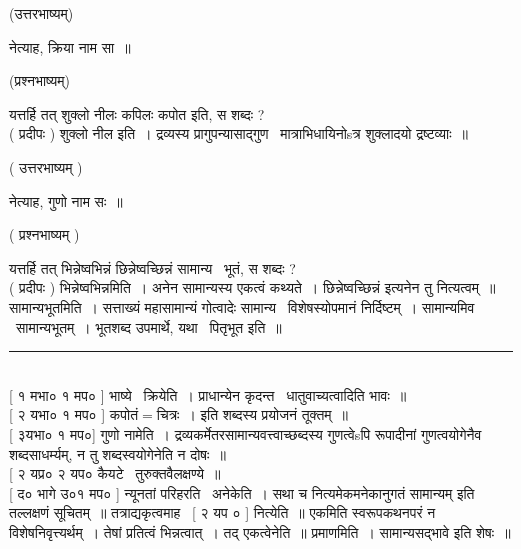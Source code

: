 \documentclass[11pt, openany]{book}
\begin{document}
\begin{multicols}{2}
\begin{center}
(उत्तरभाष्यम्)
\end{center}

{\qt नेत्याह, क्रिया नाम सा~॥}

\begin{center}
(प्रश्नभाष्यम्)
\end{center}

{\qt यत्तर्हि तत् शुक्लो नीलः कपिलः कपोत इति, स शब्दः ?}\\

( प्रदीपः ) शुक्लो नील इति~। द्रव्यस्य प्रागुपन्यासाद्गुण \textendash\ मात्राभिधायिनोsत्र शुक्लादयो द्रष्टव्याः~॥ 

\begin{center}
( उत्तरभाष्यम् )
\end{center}

{\qt नेत्याह, गुणो नाम सः~॥}

\begin{center}
( प्रश्नभाष्यम् )
\end{center}

{\qt यत्तर्हि तत् भिन्नेष्वभिन्नं छिन्नेष्वच्छिन्नं सामान्य \textendash\ भूतं, स शब्दः ? }\\

( प्रदीपः ) भिन्नेष्वभिन्नमिति~। अनेन सामान्यस्य {\qt एकत्वं} कथ्यते~। {\qt छिन्नेष्वच्छिन्नं} इत्यनेन तु {\qt नित्यत्वम्}~॥ सामान्यभूतमिति~।  सत्ताख्यं महासामान्यं गोत्वादेः सामान्य \textendash\ विशेषस्योपमानं निर्दिष्टम्~। सामान्यमिव \textendash\ सामान्यभूतम्~। भूतशब्द उपमार्थे, यथा \textendash\ पितृभूत इति~॥

\noindent
\rule{1\linewidth}{0.5pt}\\

[ १ मभा० १ मप० ] भाष्ये \textendash\ क्रियेति~। प्राधान्येन कृदन्त \textendash\ धातुवाच्यत्वादिति भावः~॥\\

[ २ यभा० १ मप० ] कपोतं$=$चित्रः~। {\qt इति} शब्दस्य प्रयोजनं तूक्तम्~॥\\

[ ३यभा० १ मप०] गुणो नामेति~। द्रव्यकर्मेतरसामान्यवत्त्वाच्छब्दस्य गुणत्वेsपि रूपादीनां गुणत्वयोगेनैव शब्दसाधर्म्यम्, न तु शब्दस्वयोगेनेति न दोषः~॥\\

[ २ यप्र० २ यप० कैयटे \textendash\ तुरुक्तवैलक्षण्ये~॥\\

[ द० भागे उ०१ मप० ] न्यूनतां परिहरति \textendash\ अनेकेति~। सथा च {\qt नित्यमेकमनेकानुगतं सामान्यम्} इति तल्लक्षणं सूचितम्~॥ तत्राद्यकृत्वमाह \textendash\ [ २ यप ० ] नित्येति~॥ एकमिति स्वरूपकथनपरं न विशेषनिवृत्त्यर्थम्~। तेषां प्रतित्वं भिन्नत्वात्~। तद् एकत्वेनेति~॥ प्रमाणमिति~। सामान्यसद्भावे इति शेषः~॥\\


\end{multicols}
\end{document}
